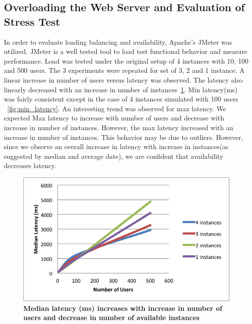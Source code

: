 \documentclass[12pt]{article}
\begin{document}
\subsection{Overloading the Web Server and Evaluation of Stress Test} In order to 
evaluate loading balancing and availability, Apache's JMeter was utilized. JMeter 
is a well tested tool to load test functional behavior and measure 
performance\cite{apache}. Load was tested under the original setup of 4 instances 
with 10, 100 and 500 users. The 3
experiments were repeated for set of 3, 2 and 1 instance. A linear increase in
number of users versus latency was observed. The latency also linearly decreased
with an increase in number of instances~\ref{fig:median_latency}. Min
latency(ms) was fairly consistent except in the case of 4 instances simulated
with 100 users ~\ref{fig:min_latency}. An interesting trend was observed for max
latency. We expected Max latency to increase with number of users and decrease
with increase in number of instances. However, the max latency increased with an
increase in number of instances. This behavior may be due to outliers. However,
since we observe an overall increase in latency with increase in instances(as
suggested by median and average date), we are confident that availability
decreases latency.  

\begin{figure}[H] 
\label{fig:median_latency} 
\centering
\includegraphics[scale=0.75]{Images/median_latency.PNG} 
\caption{\textbf{Median
latency (ms) increases with increase in number of users and decrease in number
of available instances} } 
\end{figure}
\end{document}
